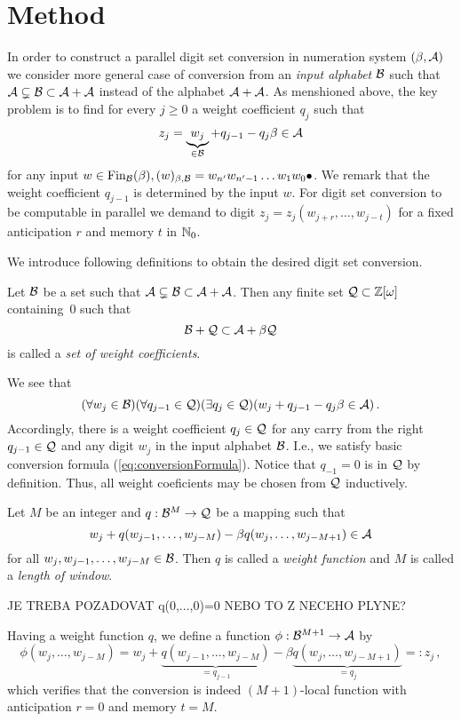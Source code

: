 \section{Method}
\label{sec:methodDescription}
In order to construct a parallel digit set conversion in numeration system $(\beta,\mathcal{A})$ we consider more general case of conversion from an \emph{input alphabet} $\mathcal{B}$ such that $\mathcal{A} \subsetneq \mathcal{B} \subset \mathcal{A} +\mathcal{A}$ instead of the alphabet $\mathcal{A}+\mathcal{A}$.
As menshioned above, the key problem is to find for every $j\geq 0$ a weight coefficient $q_j$ such that 
    $$
        z_j=\underbrace{w_j}_{\in \mathcal{B}} + q_{j-1} - q_j \beta \in \mathcal{A} 
    $$  
    for any input $w\in \text{Fin}_{\mathcal{B}}(\beta), (w)_{\beta,\mathcal{B}}=w_{n'}w_{n'-1}\dots w_1 w_0 \bullet$. We remark that the weight coefficient $q_{j-1}$ is determined by the input $w$. For digit set conversion to be computable in parallel we demand to digit $z_j=z_j(w_{j+r},\dots,w_{j-t})$ for a fixed anticipation $r$ and memory $t$ in $\mathbb{N}_0$.
    
    We introduce following definitions to obtain the desired digit set conversion. 
    \begin{defn}
        Let $\mathcal{B}$ be a set such that $\mathcal{A} \subsetneq \mathcal{B} \subset \mathcal{A} +\mathcal{A}$. Then any finite set $\mathcal{Q}\subset\mathbb{Z}[\omega]$ containing~0 such that 
        $$
            \mathcal{B} + \mathcal{Q} \subset \mathcal{A} + \beta \mathcal{Q}
        $$  
        is called a \emph{set of weight coefficients}.
    \end{defn}
    We see that
        $$
        (\forall w_j \in \mathcal{B})(\forall q_{j-1}\in\mathcal{Q})(\exists q_j \in \mathcal{Q} )(w_j + q_{j-1} - q_j \beta \in \mathcal{A} )\,.
        $$
    Accordingly, there is a weight coefficient $q_j \in \mathcal{Q}$ for any carry from the right $q_{j-1}\in \mathcal{Q}$ and any digit $w_j$ in the input alphabet $\mathcal{B}$. I.e., we  satisfy basic conversion formula (\ref{eq:conversionFormula}). Notice that $q_{-1}=0$ is in $\mathcal{Q}$ by definition. Thus, all weight coeficients may be chosen from $\mathcal{Q}$ inductively.
    \begin{defn}
    Let $M$ be an integer and $q:\mathcal{B}^{M} \rightarrow \mathcal{Q}$ be a mapping such that 
    $$
    w_j+ q(w_{j-1}, \dots, w_{j-M}) - \beta q(w_j, \dots, w_{j-M+1}) \in \mathcal{A}
    $$
    for all $w_j,w_{j-1}, \dots, w_{j-M} \in \mathcal{B}$. Then $q$ is called a \emph{weight function} and $M$ is called a \emph{length of window}.    
    \end{defn}
 
 JE TREBA POZADOVAT q(0,...,0)=0 NEBO TO Z NECEHO PLYNE?

 Having a weight function $q$, we define a function $\phi:\mathcal{B}^{M+1}\rightarrow \mathcal{A}$ by
    $$
        \phi(w_{j}, \dots, w_{j-M})=w_j+ \underbrace{q(w_{j-1}, \dots, w_{j-M})}_{=q_{j-1}} - \beta \underbrace{q(w_j, \dots, w_{j-M+1})}_{=q_j}=:z_j\,,
    $$ 
    which verifies that the conversion is indeed $(M+1)$-local function with anticipation $r=0$ and memory $t=M$.
    
